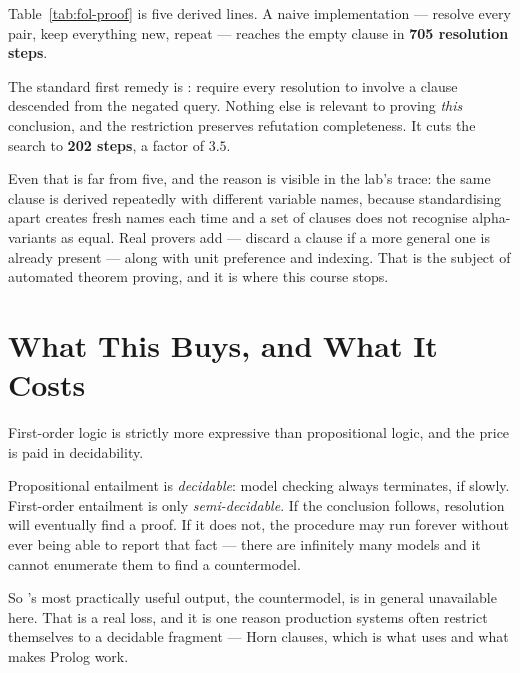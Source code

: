 \begin{alertbox}
Table~\ref{tab:fol-proof} is five derived lines. A naive implementation ---
resolve every pair, keep everything new, repeat --- reaches the empty clause in
\textbf{705 resolution steps}.

The standard first remedy is : require every resolution to
involve a clause descended from the negated query. Nothing else is relevant to
proving \emph{this} conclusion, and the restriction preserves refutation
completeness. It cuts the search to \textbf{202 steps}, a factor of $3.5$.

Even that is far from five, and the reason is visible in the lab's trace: the same
clause is derived repeatedly with different variable names, because standardising
apart creates fresh names each time and a set of clauses does not recognise
alpha-variants as equal. Real provers add  --- discard a clause
if a more general one is already present --- along with unit preference and
indexing. That is the subject of automated theorem proving, and it is where this
course stops.
\end{alertbox}

\section{What This Buys, and What It Costs}

First-order logic is strictly more expressive than propositional logic, and the
price is paid in decidability.

Propositional entailment is \emph{decidable}: model checking always terminates, if
slowly. First-order entailment is only \emph{semi-decidable}. If the conclusion
follows, resolution will eventually find a proof. If it does not, the procedure may
run forever without ever being able to report that fact --- there are infinitely
many models and it cannot enumerate them to find a countermodel.

So 's most practically useful output, the countermodel, is in
general unavailable here. That is a real loss, and it is one reason production
systems often restrict themselves to a decidable fragment --- Horn clauses, which
is what  uses and what makes Prolog work.

